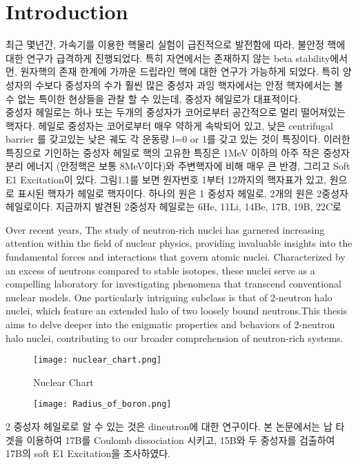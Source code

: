 \chapter{Introduction}
최근 몇년간, 가속기를 이용한 핵물리 실험이 급진적으로 발전함에 따라, 불안정 핵에 대한 연구가 급격하게 진행되었다. 특히 자연에서는 존재하지 않는 beta stability에서 먼, 원자핵의 존재 한계에 가까운 드립라인 핵에 대한 연구가 가능하게 되었다. 특히 양성자의 수보다 중성자의 수가 훨씬 많은 중성자 과잉 핵자에서는 안정 핵자에서는 볼 수 없는 특이한 현상들을 관찰 할 수 있는데, 중성자 헤일로가 대표적이다. \\
\indent 중성자 헤일로는 하나 또는 두개의 중성자가 코어로부터 공간적으로 멀리 떨어져있는 핵자다. 헤일로 중성자는 코어로부터 매우 약하게 속박되어 있고, 낮은 centrifugal barrier 를 갖고있는 낮은 궤도 각 운동량 l=0 or 1를 갖고 있는 것이 특징이다. 이러한 특징으로 기인하는 중성자 헤일로 핵의 고유한 특징은 1MeV 이하의 아주 작은 중성자 분리 에너지 (안정핵은 보통 8MeV이다)와 주변핵자에 비해 매우 큰 반경, 그리고 Soft E1 Excitation이 있다.
그림1.1를 보면 원자번호 1부터 12까지의 핵자표가 있고, 원으로 표시된 핵자가 헤일로 핵자이다. 하나의 원은 1 중성자 헤일로, 2개의 원은 2중성자 헤일로이다. 지금까지 발견된 2중성자 헤일로는 6He, 11Li, 14Be, 17B, 19B, 22C로 

Over recent years, The study of neutron-rich nuclei has garnered increasing attention within the field of nuclear physics, providing invaluable insights into the fundamental forces and interactions that govern atomic nuclei. Characterized by an excess of neutrons compared to stable isotopes, these nuclei serve as a compelling laboratory for investigating phenomena that transcend conventional nuclear models. One particularly intriguing subclass is that of 2-neutron halo nuclei, which feature an extended halo of two loosely bound neutrons.This thesis aims to delve deeper into the enigmatic properties and behaviors of 2-neutron halo nuclei, contributing to our broader comprehension of neutron-rich systems.

\begin{figure}
    \centering
    \texttt{[image: nuclear\_chart.png]}
    \caption{Nuclear Chart}
    \label{Nuclear chart}
\end{figure}
\begin{figure}[h]
    \centering
    \texttt{[image: Radius\_of\_boron.png]}
\end{figure}
2 중성자 헤일로로 알 수 있는 것은 dineutron에 대한 연구이다. 
본 논문에서는 납 타겟을 이용하여 17B를 Coulomb dissociation 시키고, 15B와 두 중성자를 검출하여 17B의 soft E1 Excitation을 조사하였다.

